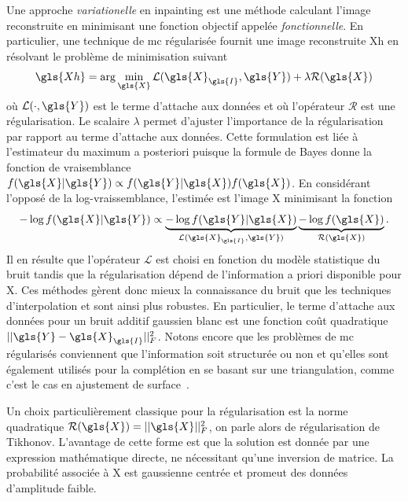 Une approche \emph{variationelle} en inpainting est une méthode calculant l'image reconstruite en minimisant une fonction objectif appelée \emph{fonctionnelle}. En particulier, une technique de \gls{mc} régularisée fournit une image reconstruite \gls{Xh} en résolvant le problème de minimisation suivant~\cite[Section~6.3]{boyd2004convex}
\begin{equation}
    \gls{Xh} = \arg\min_{\gls{X}} \mathcal{L}(\gls{X}_{\gls{I}}, \gls{Y}) + \lambda \mathcal{R}(\gls{X})
\end{equation}
où $\mathcal{L}(\cdot, \gls{Y})$ est le terme d'attache aux données et où l'opérateur $\mathcal{R}$ est une régularisation. Le scalaire $\lambda$ permet d'ajuster l'importance de la régularisation par rapport au terme d'attache aux données. Cette formulation est liée à l'estimateur du maximum a posteriori puisque la formule de Bayes donne la fonction de vraisemblance $f(\gls{X}|\gls{Y}) \propto f(\gls{Y}|\gls{X}) f(\gls{X})$. En considérant l'opposé de la log-vraissemblance, l'estimée est l'image \gls{X} minimisant la fonction
\begin{equation}
    -\log f(\gls{X}|\gls{Y}) \propto
    \underbrace{-\log f(\gls{Y}|\gls{X})}_{\mathcal{L}(\gls{X}_{\gls{I}}, \gls{Y})}
    \underbrace{- \log f(\gls{X})}_{\mathcal{R}(\gls{X})}.
\end{equation}
Il en résulte que l'opérateur $\mathcal{L}$ est choisi en fonction du modèle statistique du bruit tandis que la régularisation dépend de l'information a priori disponible pour \gls{X}. Ces méthodes gèrent donc mieux la connaissance du bruit que les techniques d'interpolation et sont ainsi plus robustes. En particulier, le terme d'attache aux données pour un bruit additif gaussien blanc est une fonction coût quadratique $||\gls{Y}-\gls{X}_{\gls{I}}||_F^2$. Notons encore que les problèmes de \gls{mc} régularisés conviennent que l'information soit structurée ou non et qu'elles sont également utilisés pour la complétion en se basant sur une triangulation, comme c'est le cas en ajustement de surface~\cite{zhong2016surface,cazals2006delaunay}.

Un choix particulièrement classique pour la régularisation est la norme quadratique $\mathcal{R}(\gls{X}) = ||\gls{X}||_F^2$, on parle alors de régularisation de Tikhonov. L'avantage de cette forme est que la solution est  donnée par une expression mathématique directe, ne nécessitant qu'une inversion de matrice. La probabilité associée à \gls{X} est gaussienne centrée et promeut des données d'amplitude faible.


